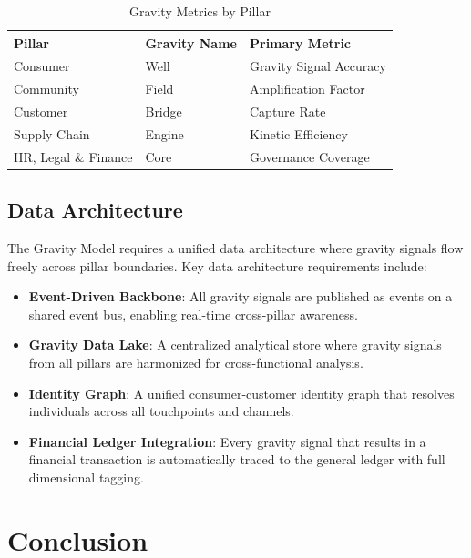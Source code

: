 \documentclass[11pt,a4paper,twocolumn]{article}
\begin{document}
\begin{table}[H]
\centering
\small
\begin{tabular}{@{}p{1.8cm}p{1.7cm}p{2.4cm}@{}}
\toprule
\textbf{Pillar} & \textbf{Gravity Name} & \textbf{Primary Metric} \\
\midrule
Consumer    & Well   & Gravity Signal Accuracy \\
Community   & Field  & Amplification Factor \\
Customer    & Bridge & Capture Rate \\
Supply Chain & Engine & Kinetic Efficiency \\
HR, Legal \& Finance & Core & Governance Coverage \\
\bottomrule
\end{tabular}
\caption{Gravity Metrics by Pillar}
\label{tab:metrics}
\end{table}

\subsection{Data Architecture}

The Gravity Model requires a unified data architecture where gravity signals flow freely across pillar boundaries. Key data architecture requirements include:

\begin{itemize}[leftmargin=1.5em]
  \item \textbf{Event-Driven Backbone}: All gravity signals are published as events on a shared event bus, enabling real-time cross-pillar awareness.
  \item \textbf{Gravity Data Lake}: A centralized analytical store where gravity signals from all pillars are harmonized for cross-functional analysis.
  \item \textbf{Identity Graph}: A unified consumer-customer identity graph that resolves individuals across all touchpoints and channels.
  \item \textbf{Financial Ledger Integration}: Every gravity signal that results in a financial transaction is automatically traced to the general ledger with full dimensional tagging.
\end{itemize}


\section{Conclusion}
\label{sec:conclusion}
\end{document}
